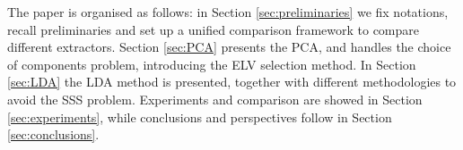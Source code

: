 The paper is organised as follows: in Section \ref{sec:preliminaries} we fix notations, recall preliminaries and set up a unified comparison framework to compare different extractors. Section \ref{sec:PCA} presents the PCA, and handles the choice of components problem, introducing the  ELV selection method. In Section \ref{sec:LDA} the LDA method is presented, together with different methodologies to avoid the SSS problem. Experiments and comparison are showed in Section \ref{sec:experiments}, while conclusions and perspectives follow in Section \ref{sec:conclusions}. 

